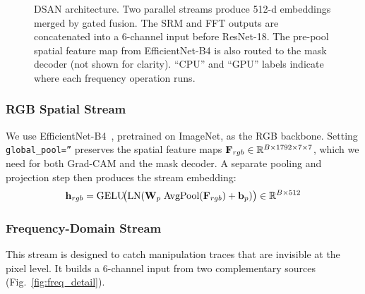 \begin{figure}[t]
\caption{DSAN architecture. Two parallel streams produce 512-d embeddings merged by gated fusion. The SRM and FFT outputs are concatenated into a 6-channel input before ResNet-18. The pre-pool spatial feature map from EfficientNet-B4 is also routed to the mask decoder (not shown for clarity). ``CPU'' and ``GPU'' labels indicate where each frequency operation runs.}
\label{fig:dsan_arch}
\end{figure}

\subsubsection{RGB Spatial Stream}
We use EfficientNet-B4~\cite{tan2019efficientnet}, pretrained on ImageNet, as the RGB backbone. Setting \texttt{global\_pool=''} preserves the spatial feature maps $\mathbf{F}_{rgb} \in \mathbb{R}^{B \times 1792 \times 7 \times 7}$, which we need for both Grad-CAM and the mask decoder. A separate pooling and projection step then produces the stream embedding:
\begin{equation}
    \mathbf{h}_{rgb} = \text{GELU}\!\big(\text{LN}(\mathbf{W}_p\;\text{AvgPool}(\mathbf{F}_{rgb}) + \mathbf{b}_p)\big) \in \mathbb{R}^{B \times 512}
    \label{eq:rgb}
\end{equation}

\subsubsection{Frequency-Domain Stream}
\label{sec:freq_stream}

This stream is designed to catch manipulation traces that are invisible at the pixel level. It builds a 6-channel input from two complementary sources (Fig.~\ref{fig:freq_detail}).

